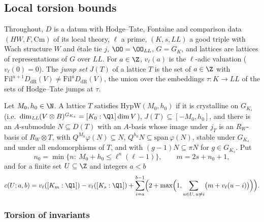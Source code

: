 \subsection{Local torsion bounds}\label{pf:sh-hodge:loc}

Throughout, $D$ is a datum with Hodge--Tate, Fontaine and comparison data $(HW,F,\mathrm{Cm})$ of its local theory, $\ell$ a prime,
$(K,s,\mathit{LL})$ a good triple with Wach structure $W$ and \'etale tie $j$, $\OO=\OO_{\mathit{LL}}$, $G=G_K$, and lattices are lattices of
representations of $G$ over $\mathit{LL}$. For $a\in\Z$, $v_\ell(a)$ is the $\ell$-adic valuation ($v_\ell(0)=0$). The \emph{jump set} $J(T)$ of a
lattice $T$ is the set of $a\in\Z$ with $\mathrm{Fil}^{a+1}D_{\mathrm{dR}}(V)\ne\mathrm{Fil}^aD_{\mathrm{dR}}(V)$, the union over the embeddings
$\tau\colon K\to\mathit{LL}$ of the sets of Hodge--Tate jumps at $\tau$.

\begin{definition}\label{pf:sh-hodge:def-hypw}
Let $M_0,h_0\in\N$. A lattice $T$ satisfies $\mathrm{HypW}(M_0,h_0)$ if it is crystalline on $G_{K_s}$ (i.e.\ $\dim_{\mathit{LL}}(V\otimes
B)^{G_{K_s}}=[K_0:\Ql]\dim V$), $J(T)\subseteq[-M_0,h_0]$, and there is an $A$-submodule $N\subseteq D(T)$ with an $A$-basis whose image under
$j_T$ is an $R_W$-basis of $R_W\otimes T$, with $Q^{M_0}\varphi(N)\subseteq N$, $Q^{h_0}N\subseteq\mathrm{span}\,\varphi(N)$, stable under
$G_{K_s}$ and under all endomorphisms of $T$, and with $(g-1)N\subseteq\pi N$ for $g\in G_{K_s}$. Put
\[
n_0=\min\{n:\ M_0+h_0\le\ell^n(\ell-1)\},\qquad m=2s+n_0+1,
\]
and for a finite set $U\subseteq\Z$ and integers $a<b$
\[
c(U;a,b)=v_\ell([K_m:\Ql])-v_\ell([K_s:\Ql])+\sum_{i=a}^{b-1}\Bigl(2+\max\Bigl(1,\sum_{u\in U,\,u\ne i}\bigl(m+v_\ell(u-i)\bigr)\Bigr)\Bigr).
\]
\end{definition}

\subsubsection{Torsion of invariants}

